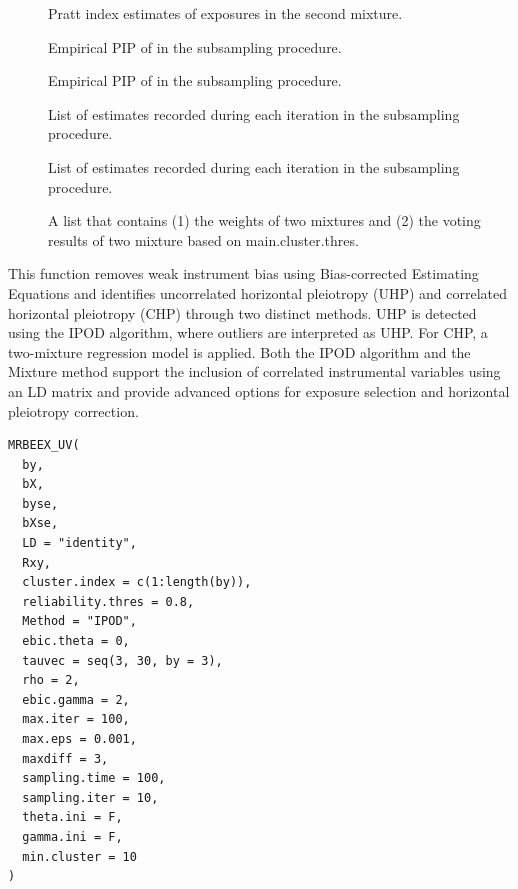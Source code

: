 \documentclass[a4paper]{book}
\begin{document}
\begin{Value}
\begin{description}
\item[] Pratt index estimates of exposures in the second mixture.
\item[] Empirical PIP of  in the subsampling procedure.
\item[] Empirical PIP of  in the subsampling procedure.
\item[] List of  estimates recorded during each iteration in the subsampling procedure.
\item[] List of  estimates recorded during each iteration in the subsampling procedure.
\item[] A list that contains (1) the weights of two mixtures and (2) the voting results of two mixture based on main.cluster.thres.

\end{description}

\end{Value}
%
\begin{Description}
This function removes weak instrument bias using Bias-corrected Estimating Equations and identifies uncorrelated horizontal pleiotropy (UHP) and correlated horizontal pleiotropy (CHP) through two distinct methods. UHP is detected using the IPOD algorithm, where outliers are interpreted as UHP. For CHP, a two-mixture regression model is applied. Both the IPOD algorithm and the Mixture method support the inclusion of correlated instrumental variables using an LD matrix and provide advanced options for exposure selection and horizontal pleiotropy correction.
\end{Description}
%
\begin{Usage}
\begin{verbatim}
MRBEEX_UV(
  by,
  bX,
  byse,
  bXse,
  LD = "identity",
  Rxy,
  cluster.index = c(1:length(by)),
  reliability.thres = 0.8,
  Method = "IPOD",
  ebic.theta = 0,
  tauvec = seq(3, 30, by = 3),
  rho = 2,
  ebic.gamma = 2,
  max.iter = 100,
  max.eps = 0.001,
  maxdiff = 3,
  sampling.time = 100,
  sampling.iter = 10,
  theta.ini = F,
  gamma.ini = F,
  min.cluster = 10
)
\end{verbatim}
\end{Usage}
%
\end{document}
